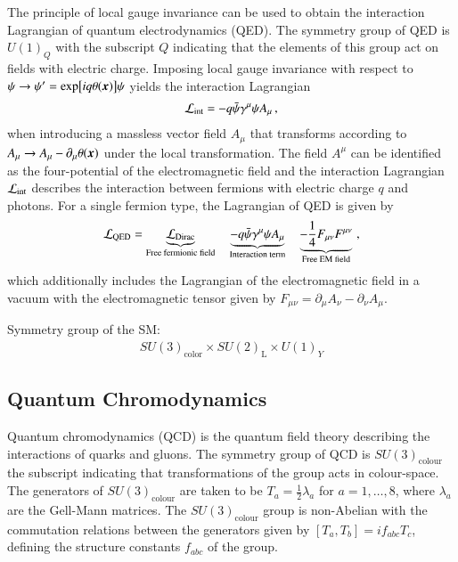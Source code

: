 The principle of local gauge invariance can be used to obtain the interaction
Lagrangian of quantum electrodynamics (QED). The symmetry group of QED is
$U(1)_{Q}$ with the subscript $Q$ indicating that the elements of this group act
on fields with electric charge. Imposing local gauge invariance with respect to
$\psi \to \psi^\prime = \exp[i q \theta(\myvec{x})] \psi$ yields the interaction Lagrangian
\begin{align*}
  \mathcal{L}_{\text{int}} = - q \bar{\psi} \gamma^\mu \psi A_\mu \,\text{,}
\end{align*}
when introducing a massless vector field $A_\mu$ that transforms according to
$A_\mu \to A_\mu - \partial_\mu \theta(\myvec{x})$ under the local
transformation. The field $A^\mu$ can be identified as the four-potential of the
electromagnetic field and the interaction Lagrangian $\mathcal{L}_{\text{int}}$
describes the interaction between fermions with electric charge $q$ and
photons. For a single fermion type, the Lagrangian of QED is given by
\begin{align*}
  \mathcal{L}_{\text{QED}} = \underbrace{\mathcal{L}_{\text{Dirac}}}_{\text{Free fermionic field}}
  \quad \underbrace{- q \bar{\psi} \gamma^\mu \psi A_\mu}_{\text{Interaction term}}
  \quad \underbrace{- \frac{1}{4} F_{\mu\nu} F^{\mu\nu}}_{\text{Free EM field}} \,\text{,}
\end{align*}
which additionally includes the Lagrangian of the electromagnetic field in a
vacuum with the electromagnetic tensor given by
$F_{\mu\nu} = \partial_\mu A_\nu - \partial_\nu A_\mu$.


Symmetry group of the SM:
\begin{align*}
  SU(3)_{\text{color}} \times SU(2)_{\text{L}} \times U(1)_Y
\end{align*}



\subsection{Quantum Chromodynamics}

Quantum chromodynamics (QCD) is the quantum field theory describing the
interactions of quarks and gluons. The symmetry group of QCD is
$SU(3)_{\text{colour}}$ the subscript indicating that transformations of the
group acts in colour-space. The generators of $SU(3)_{\text{colour}}$ are taken
to be $T_a = \frac{1}{2} \lambda_a$ for $a = 1, \dots, 8$, where $\lambda_a$ are
the Gell-Mann matrices. The $SU(3)_{\text{colour}}$ group is non-Abelian with
the commutation relations between the generators given by
$[T_a, T_b] = i f_{abc} T_c$, defining the structure constants $f_{abc}$ of the
group.

